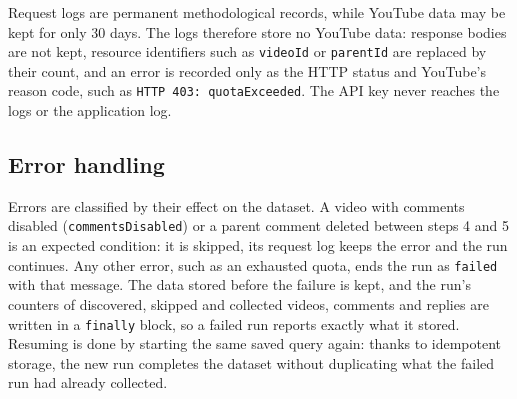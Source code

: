 Request logs are permanent methodological records, while YouTube data may be kept for only 30 days. The logs therefore store no YouTube data: response bodies are not kept, resource identifiers such as \texttt{videoId} or \texttt{parentId} are replaced by their count, and an error is recorded only as the HTTP status and YouTube's reason code, such as \texttt{HTTP 403: quotaExceeded}. The API key never reaches the logs or the application log.

\subsection{Error handling}

Errors are classified by their effect on the dataset. A video with comments disabled (\texttt{commentsDisabled}) or a parent comment deleted between steps 4 and 5 is an expected condition: it is skipped, its request log keeps the error and the run continues. Any other error, such as an exhausted quota, ends the run as \texttt{failed} with that message. The data stored before the failure is kept, and the run's counters of discovered, skipped and collected videos, comments and replies are written in a \texttt{finally} block, so a failed run reports exactly what it stored. Resuming is done by starting the same saved query again: thanks to idempotent storage, the new run completes the dataset without duplicating what the failed run had already collected.
